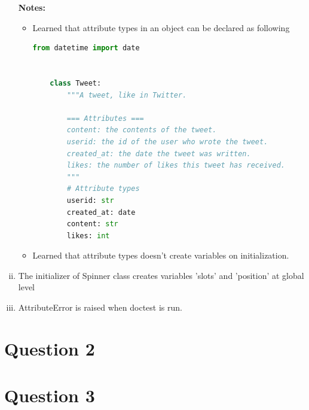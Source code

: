 \documentclass[12pt]{article}
\begin{document}
\begin{enumerate}[i.]
    \bigskip

    \textbf{Notes:}

    \begin{itemize}
    \item Learned that attribute types in an object can be declared as following

    \begin{lstlisting}[language=Python]
    from datetime import date


    class Tweet:
        """A tweet, like in Twitter.

        === Attributes ===
        content: the contents of the tweet.
        userid: the id of the user who wrote the tweet.
        created_at: the date the tweet was written.
        likes: the number of likes this tweet has received.
        """
        # Attribute types
        userid: str
        created_at: date
        content: str
        likes: int
    \end{lstlisting}

    \item Learned that attribute types doesn't create variables on initialization.
    \end{itemize}

    \item The initializer of Spinner class creates variables 'slots' and 'position' at
    global level

    \item AttributeError is raised when doctest is run.
\end{enumerate}

\section*{Question 2}

\section*{Question 3}
\end{document}
